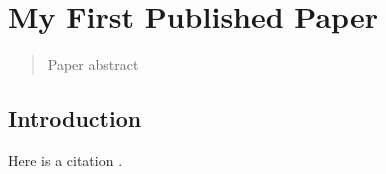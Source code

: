 \chapter{My First Published Paper}
\label{sec:asdf}

\begin{quote}
Paper abstract
\end{quote}


\section{Introduction}
Here is a citation .



